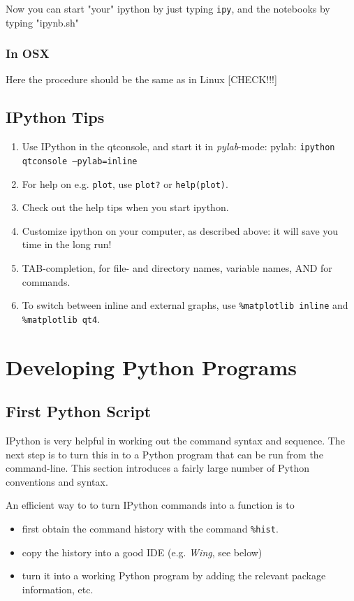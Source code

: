 Now you can start "your" ipython by just typing \lstinline{ipy}, and the notebooks by typing "ipynb.sh"

\subsubsection{In OSX}

Here the procedure should be the same as in Linux [CHECK!!!]

\subsection{IPython Tips}

\begin{enumerate}
    \item Use IPython in the qtconsole, and start it in \emph{pylab}-mode: pylab: \texttt{ipython qtconsole ---pylab=inline}
    \item For help on e.g. \texttt{plot}, use \texttt{plot?} or \texttt{help(plot)}.
    \item Check out the help tips when you start ipython.
    \item Customize ipython on your computer, as described above: it will save you time in the long run!
    \item TAB-completion, for file- and directory names, variable names, AND for commands.
    \item To switch between inline and external graphs, use \; \texttt{\%matplotlib inline} and \; \texttt{\%matplotlib qt4}.
\end{enumerate}

\section{Developing Python Programs}

\subsection{First Python Script}

IPython is very helpful in working out the command syntax and sequence. The next step is to turn this in to a Python program that can be run from the command-line. This section introduces a fairly large number of Python conventions and syntax.

An efficient way to to turn IPython commands into a function is to

\begin{itemize}
  \item first obtain the command history with the command \lstinline{%hist}.
  \item copy the history into a good IDE (e.g. \emph{Wing}, see below)
  \item turn it into a working Python program by adding the relevant package information, etc.
\end{itemize}

